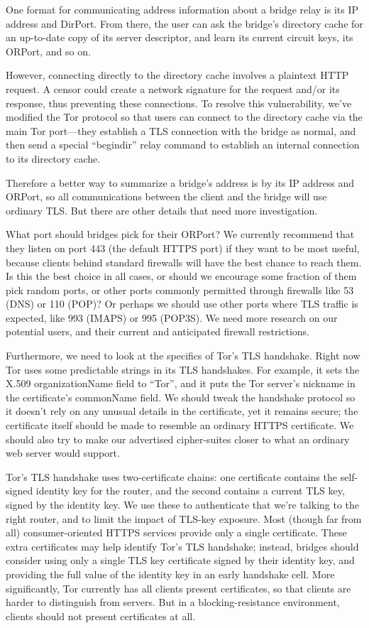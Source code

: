 \documentclass{llncs}
\begin{document}
One format for communicating address information about a bridge relay is
its IP address and DirPort. From there, the user can ask the bridge's
directory cache for an up-to-date copy of its server descriptor, and
learn its current circuit keys, its ORPort, and so on.

However, connecting directly to the directory cache involves a plaintext
HTTP request. A censor could create a network signature for the request
and/or its response, thus preventing these connections. To resolve this
vulnerability, we've modified the Tor protocol so that users can connect
to the directory cache via the main Tor port---they establish a TLS
connection with the bridge as normal, and then send a special ``begindir''
relay command to establish an internal connection to its directory cache.

Therefore a better way to summarize a bridge's address is by its IP
address and ORPort, so all communications between the client and the
bridge will use ordinary TLS. But there are other details that need
more investigation.

What port should bridges pick for their ORPort? We currently recommend
that they listen on port 443 (the default HTTPS port) if they want to
be most useful, because clients behind standard firewalls will have
the best chance to reach them. Is this the best choice in all cases,
or should we encourage some fraction of them pick random ports, or other
ports commonly permitted through firewalls like 53 (DNS) or 110
(POP)?  Or perhaps we should use other ports where TLS traffic is
expected, like 993 (IMAPS) or 995 (POP3S).  We need more research on our
potential users, and their current and anticipated firewall restrictions.

Furthermore, we need to look at the specifics of Tor's TLS handshake.
Right now Tor uses some predictable strings in its TLS handshakes. For
example, it sets the X.509 organizationName field to ``Tor'', and it puts
the Tor server's nickname in the certificate's commonName field. We
should tweak the handshake protocol so it doesn't rely on any unusual details
in the certificate, yet it remains secure; the certificate itself
should be made to resemble an ordinary HTTPS certificate.  We should also try
to make our advertised cipher-suites closer to what an ordinary web server
would support.

Tor's TLS handshake uses two-certificate chains: one certificate
contains the self-signed identity key for
the router, and the second contains a current TLS key, signed by the
identity key. We use these to authenticate that we're talking to the right
router, and to limit the impact of TLS-key exposure.  Most (though far from
all) consumer-oriented HTTPS services provide only a single certificate.
These extra certificates may help identify Tor's TLS handshake; instead,
bridges should consider using only a single TLS key certificate signed by
their identity key, and providing the full value of the identity key in an
early handshake cell.  More significantly, Tor currently has all clients
present certificates, so that clients are harder to distinguish from servers.
But in a blocking-resistance environment, clients should not present
certificates at all.
\end{document}

